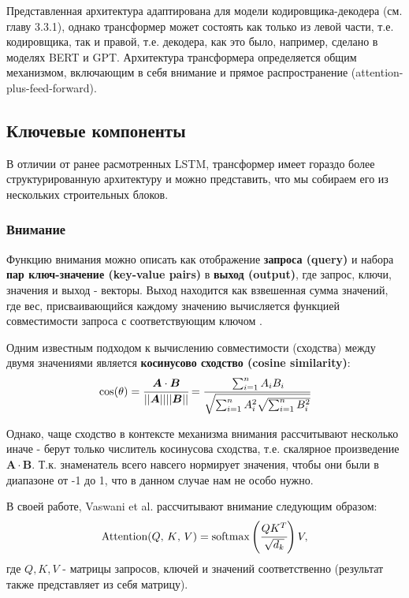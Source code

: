 Представленная архитектура адаптирована для модели кодировщика-декодера 
(см. главу 3.3.1), однако трансформер может состоять как только из 
левой части, т.е. кодировщика, так и правой, т.е. декодера, как это было, например, 
сделано в моделях BERT и GPT. 
Архитектура трансформера определяется общим механизмом, включающим в себя 
внимание и прямое распространение (attention-plus-feed-forward).

\subsection{Ключевые компоненты} %

В отличии от ранее расмотренных LSTM, трансформер имеет гораздо более 
структурированную архитектуру и можно представить, что мы собираем его 
из нескольких строительных блоков.

\subsubsection{Внимание}

Функцию внимания можно описать как отображение \textbf{запроса (query)} 
и набора \textbf{пар ключ-значение (key-value pairs)} в \textbf{выход (output)}, 
где запрос, ключи, значения и выход - векторы. Выход находится как 
взвешенная сумма значений, где вес, присваивающийся каждому значению 
вычисляется функцией совместимости запроса с соответствующим ключом 
\cite{vaswani2017attention}. 

Одним известным подходом к вычислению совместимости (сходства) между двумя значениями 
является \textbf{косинусово сходство (cosine similarity)}:
\begin{equation*}
    \cos(\theta) = \cfrac{\bm{A} \cdot \bm{B}}{|| \bm{A} || || \bm{B} ||} = 
    \cfrac{\sum_{i=1}^n A_i B_i}{\sqrt{\sum_{i=1}^n A_i^2 \sqrt{\sum_{i=1}^n B_i^2}}}
\end{equation*}

Однако, чаще сходство в контексте механизма внимания рассчитывают несколько иначе - 
берут только числитель косинусова сходства, т.е. скалярное 
произведение $\bm{A} \cdot \bm{B}$. Т.к. знаменатель всего навсего 
нормирует значения, чтобы они были в диапазоне от -1 до 1, что в данном случае нам не 
особо нужно. 

В своей работе, Vaswani et al. рассчитывают внимание следующим образом:
\begin{equation*}
    \text{Attention($Q$, $K$, $V$)} = \text{softmax} \left( \cfrac{Q K^T}{\sqrt{d_k}} \right) V,
\end{equation*}
где $Q, K, V$ - матрицы запросов, ключей и значений соответственно (результат 
также представляет из себя матрицу).

